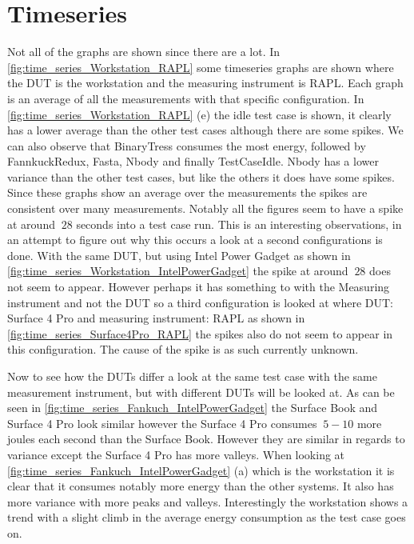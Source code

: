 \section{Timeseries}\label{sec:timeseries}


Not all of the graphs are shown since there are a lot. In \cref{fig:time_series_Workstation_RAPL} some timeseries graphs are shown where the DUT is the workstation and the measuring instrument is RAPL. Each graph is an average of all the measurements with that specific configuration. In \cref{fig:time_series_Workstation_RAPL} (e) the idle test case is shown, it clearly has a lower average than the other test cases although there are some spikes. We can also observe that BinaryTress consumes the most energy, followed by FannkuckRedux, Fasta, Nbody and finally TestCaseIdle. Nbody has a lower variance than the other test cases, but like the others it does have some spikes. Since these graphs show an average over the measurements the spikes are consistent over many measurements. Notably all the figures seem to have a spike at around $~28$ seconds into a test case run. This is an interesting observations, in an attempt to figure out why this occurs a look at a second configurations is done. With the same DUT, but using Intel Power Gadget as shown in \cref{fig:time_series_Workstation_IntelPowerGadget} the spike at around $~28$ does not seem to appear. However perhaps it has something to with the Measuring instrument and not the DUT so a third configuration is looked at where DUT: Surface 4 Pro and measuring instrument: RAPL as shown in \cref{fig:time_series_Surface4Pro_RAPL} the spikes also do not seem to appear in this configuration. The cause of the spike is as such currently unknown.\nytafsnit


%
%


%

Now to see how the DUTs differ a look at the same test case with the same measurement instrument, but with different DUTs will be looked at. As can be seen in \cref{fig:time_series_Fankuch_IntelPowerGadget} the Surface Book and Surface 4 Pro look similar however the Surface 4 Pro consumes $~5-10$ more joules each second than the Surface Book. However they are similar in regards to variance except the Surface 4 Pro has more valleys. When looking at \cref{fig:time_series_Fankuch_IntelPowerGadget} (a) which is the workstation it is clear that it consumes notably more energy than the other systems. It also has more variance with more peaks and valleys. Interestingly the workstation shows a trend with a slight climb in the average energy consumption as the test case goes on.

